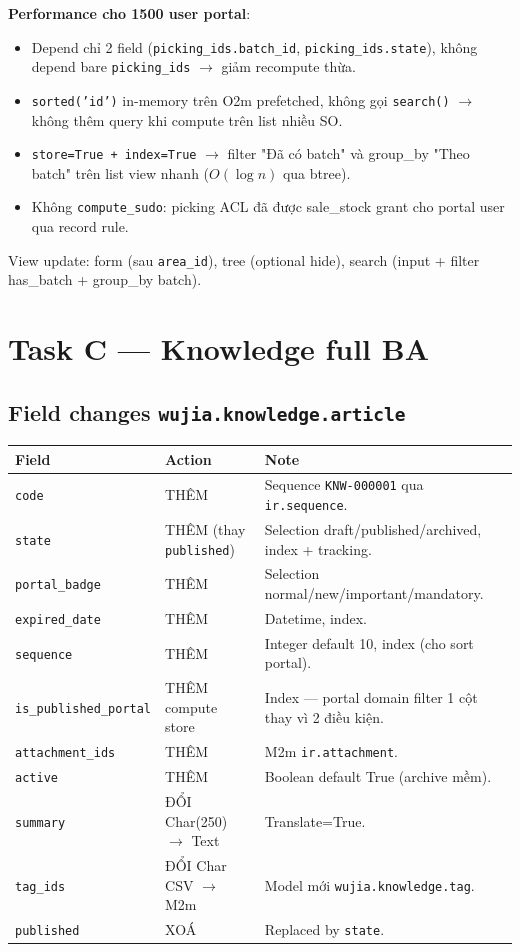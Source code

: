 \textbf{Performance cho 1500 user portal}:

\begin{itemize}[leftmargin=*]
    \item Depend chỉ 2 field (\texttt{picking\_ids.batch\_id}, \texttt{picking\_ids.state}), không depend bare \texttt{picking\_ids} $\rightarrow$ giảm recompute thừa.
    \item \texttt{sorted('id')} in-memory trên O2m prefetched, không gọi \texttt{search()} $\rightarrow$ không thêm query khi compute trên list nhiều SO.
    \item \texttt{store=True + index=True} $\rightarrow$ filter "Đã có batch" và group\_by "Theo batch" trên list view nhanh ($O(\log n)$ qua btree).
    \item Không \texttt{compute\_sudo}: picking ACL đã được sale\_stock grant cho portal user qua record rule.
\end{itemize}

View update: form (sau \texttt{area\_id}), tree (optional hide), search (input + filter has\_batch + group\_by batch).

\section{Task C --- Knowledge full BA}

\subsection{Field changes \texttt{wujia.knowledge.article}}

\begin{longtable}{p{4cm}p{4cm}p{6cm}}
\toprule
Field & Action & Note \\
\midrule
\endhead
\texttt{code} & THÊM & Sequence \texttt{KNW-000001} qua \texttt{ir.sequence}. \\
\texttt{state} & THÊM (thay \texttt{published}) & Selection draft/published/archived, index + tracking. \\
\texttt{portal\_badge} & THÊM & Selection normal/new/important/mandatory. \\
\texttt{expired\_date} & THÊM & Datetime, index. \\
\texttt{sequence} & THÊM & Integer default 10, index (cho sort portal). \\
\texttt{is\_published\_portal} & THÊM compute store & Index --- portal domain filter 1 cột thay vì 2 điều kiện. \\
\texttt{attachment\_ids} & THÊM & M2m \texttt{ir.attachment}. \\
\texttt{active} & THÊM & Boolean default True (archive mềm). \\
\texttt{summary} & ĐỔI Char(250) $\rightarrow$ Text & Translate=True. \\
\texttt{tag\_ids} & ĐỔI Char CSV $\rightarrow$ M2m & Model mới \texttt{wujia.knowledge.tag}. \\
\texttt{published} & XOÁ & Replaced by \texttt{state}. \\
\bottomrule
\end{longtable}

